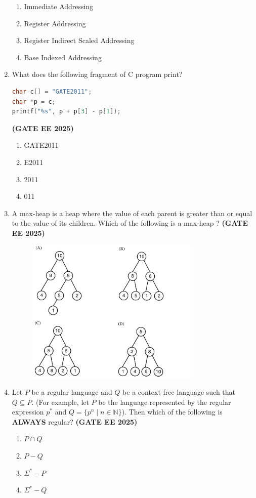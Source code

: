 \documentclass[journal,12pt,onecolumn]{IEEEtran}
\theoremstyle{remark}
\begin{document}
\begin{enumerate}
\begin{enumerate}
  \item Immediate Addressing
  \item Register Addressing
  \item Register Indirect Scaled Addressing
  \item Base Indexed Addressing
\end{enumerate}


\item What does the following fragment of C program print?

\begin{lstlisting}[language=C]
char c[] = "GATE2011";
char *p = c;
printf("%s", p + p[3] - p[1]);
\end{lstlisting}
\hfill \textbf{(GATE EE 2025)}
\begin{enumerate}
  \item GATE2011
  \item E2011
  \item 2011
  \item 011
\end{enumerate}
\item A max-heap is a heap where the value of each parent is greater than or equal to the value of its children. Which of the following is a max-heap ? \hfill \textbf{(GATE EE 2025)}
\begin{figure}[h]
    \centering
    \includegraphics[width=0.5\linewidth]{figs/fig3.png}
    \caption{ }
    \label{fig3}
\end{figure}

\item Let $ P $ be a regular language and $ Q $ be a context-free language such that $ Q \subseteq P $. (For example, let $ P $ be the language represented by the regular expression $ p^* $ and $ Q = \{p^n \mid n \in \mathbb{N}\} $). Then which of the following is \textbf{ALWAYS} regular? \hfill \textbf{(GATE EE 2025)}

\begin{enumerate}
    \item $ P \cap Q $
    \item $ P - Q $
    \item $ \Sigma^* - P $
    \item $ \Sigma^* - Q $
\end{enumerate}




\end{enumerate}
\end{document}
